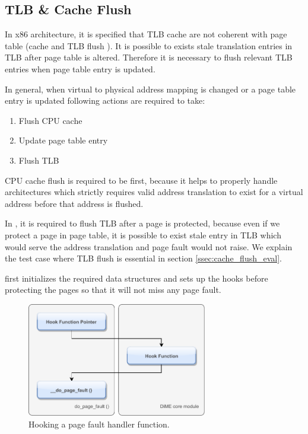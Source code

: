 \subsection{TLB \& Cache Flush} \label{ssec:tlb_flush}
In x86 architecture, it is specified that TLB cache are not coherent with page table (cache and TLB flush \citep{cachetlb}). It is possible to exists stale translation entries in TLB after page table is altered. Therefore it is necessary to flush relevant TLB entries when page table entry is updated. 

In general, when virtual to physical address mapping is changed or a page table entry is updated following actions are required to take:
\begin{enumerate}
	\item Flush CPU cache
	\item Update page table entry
	\item Flush TLB
\end{enumerate}

CPU cache flush is required to be first, because it helps to properly handle architectures which strictly requires valid address translation to exist for a virtual address before that address is flushed.

In {\dime}, it is required to flush TLB after a page is protected, because even if we protect a page in page table, it is possible to exist stale entry in TLB which would serve the address translation and page fault would not raise. We explain the test case where TLB flush is essential in section \ref{ssec:cache_flush_eval}.

{\dime} first initializes the required data structures and sets up the hooks before protecting the pages so that it will not miss any page fault.

\begin{figure}[tbp]
  \centering
    \includegraphics[width=0.7\textwidth]{implementation/hook.pdf}
    \caption[Hook Function]{Hooking a page fault handler function.}
    \label{fig:hook_1} 
\end{figure}


